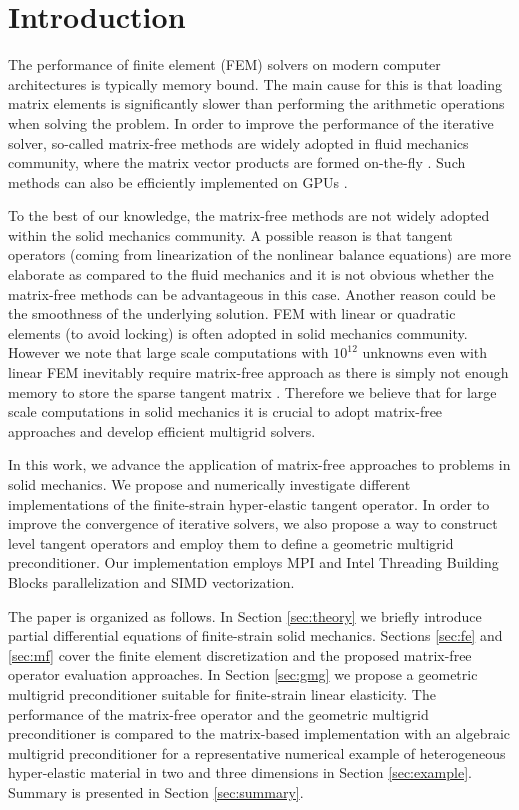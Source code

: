 \documentclass[preprint,12pt,times]{elsarticle}
\begin{document}
\section{Introduction}

The performance of finite element (FEM) solvers on modern computer architectures is typically memory bound.
The main cause for this is that loading matrix elements is significantly slower than performing the arithmetic operations when solving the problem.
In order to improve the performance of the iterative solver, so-called matrix-free methods are
widely adopted in fluid mechanics community, where the matrix vector products are formed on-the-fly \cite{kronbichler12,May2015, Krank2017}. Such methods can also be efficiently implemented on GPUs \cite{Abdelfattah2016}.

To the best of our knowledge, the matrix-free methods are not widely adopted within the solid mechanics community.
A possible reason is that tangent operators (coming from linearization of the nonlinear balance equations) are
more elaborate as compared to the fluid mechanics and it is not obvious whether the matrix-free methods can be advantageous in this case. Another reason could be the smoothness of the underlying solution. FEM with linear or quadratic elements (to avoid locking) is often adopted in solid mechanics community. However we note that large scale computations with $10^{12}$ unknowns even with linear FEM inevitably require matrix-free approach as there is simply not enough memory to store the sparse tangent matrix \cite{Gmeiner2016}. Therefore we believe that for large scale computations in solid mechanics it is crucial to adopt matrix-free approaches and develop efficient multigrid solvers.

In this work, we advance the application of matrix-free approaches to problems in solid mechanics.
We propose and numerically investigate different implementations of the finite-strain hyper-elastic tangent operator.
In order to improve the convergence of iterative solvers, we also propose a way to construct level tangent operators
and employ them to define a geometric multigrid preconditioner.
Our implementation employs MPI and Intel Threading Building Blocks parallelization and SIMD vectorization.

The paper is organized as follows. In Section \ref{sec:theory} we briefly introduce partial differential equations of finite-strain solid mechanics. Sections \ref{sec:fe} and \ref{sec:mf} cover the finite element discretization and the proposed matrix-free operator evaluation approaches. In Section \ref{sec:gmg} we propose a geometric multigrid preconditioner suitable for finite-strain linear elasticity. The performance of the matrix-free operator and the geometric multigrid preconditioner is compared to the matrix-based implementation with an algebraic multigrid preconditioner for a representative numerical example of heterogeneous hyper-elastic material in two and three dimensions in Section \ref{sec:example}. Summary is presented in Section \ref{sec:summary}.
\end{document}
